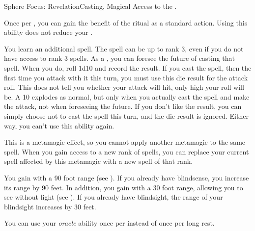   \begin{magicalfeat}{Sphere Focus: Revelation}{Casting, Magical}
    \featpre Access to the  .

     Once per , you can gain the benefit of the  ritual as a standard action.
    Using this ability does not reduce your .

     You learn an additional spell.
    The spell can be up to rank 3, even if you do not have access to rank 3 spells.
    As a , you can foresee the future of casting that spell.
    When you do, roll 1d10 and record the result.
    If you cast the spell, then the first time you attack with it this turn, you must use this die result for the attack roll.
    This does not tell you whether your attack will hit, only high your roll will be.
    A 10 explodes as normal, but only when you actually cast the spell and make the attack, not when foreseeing the future.
    If you don't like the result, you can simply choose not to cast the spell this turn, and the die result is ignored.
    Either way, you \briefly can't use this ability again.

    This is a metamagic effect, so you cannot apply another metamagic to the same spell.
    When you gain access to a new rank of spells, you can replace your current spell affected by this metamagic with a new spell of that rank.

     You gain  with a 90 foot range (see ).
    If you already have blindsense, you increase its range by 90 feet.
    In addition, you gain  with a 30 foot range, allowing you to see without light (see ).
    If you already have blindsight, the range of your blindsight increases by 30 feet.

     You can use your \textit{oracle} ability once per  instead of once per long rest.
  \end{magicalfeat}

